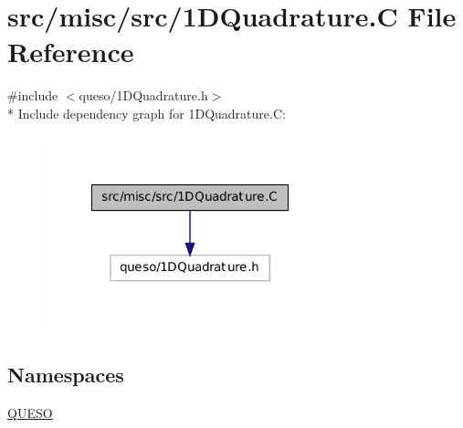\hypertarget{1_d_quadrature_8_c}{\section{src/misc/src/1\-D\-Quadrature.C File Reference}
\label{1_d_quadrature_8_c}
}
{\ttfamily \#include $<$queso/1\-D\-Quadrature.\-h$>$}\\*
Include dependency graph for 1\-D\-Quadrature.C\-:
\nopagebreak
\begin{figure}[H]
\begin{center}
\leavevmode
\includegraphics[width=240pt]{1_d_quadrature_8_c__incl}
\end{center}
\end{figure}
\subsection*{Namespaces}
\begin{DoxyCompactItemize}
\item 
\hyperlink{namespace_q_u_e_s_o}{Q\-U\-E\-S\-O}
\end{DoxyCompactItemize}
